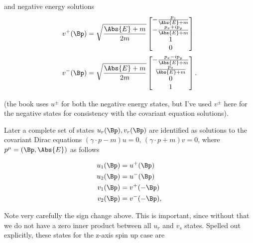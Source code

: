 and negative energy solutions
\begin{subequations}
\begin{align}\label{eqn:desaiDiracAdjoint:90}
v^{+}(\Bp) &=
\sqrt{\frac{\Abs{E} + m}{2m}}
\begin{bmatrix}
-\frac{p_z}{\Abs{E} + m} \\
-\frac{p_x + i p_y}{\Abs{E} + m} \\
1 \\
0 \\
\end{bmatrix} \\
v^{-}(\Bp) &=
\sqrt{\frac{\Abs{E} + m}{2m}}
\begin{bmatrix}
-\frac{p_x - i p_y}{\Abs{E} + m} \\
\frac{p_z}{\Abs{E} + m} \\
0 \\
1 \\
\end{bmatrix}.
\end{align}
\end{subequations}

(the book uses $u^{\pm}$ for both the negative energy states, but I've used $v^{\pm}$ here for the negative states for consistency with the covariant equation solutions). 

Later a complete set of states $u_r(\Bp), v_r(\Bp)$ are identified as solutions to the covariant Dirac equations $(\gamma \cdot p -m)u = 0$, $(\gamma \cdot p + m) v = 0$, where $p^\mu = (\Bp, \Abs{E})$ as follows

\begin{subequations}
\begin{align}\label{eqn:desaiDiracAdjoint:110}
u_1(\Bp) &= u^{+}(\Bp) \\
u_2(\Bp) &= u^{-}(\Bp) \\
v_1(\Bp) &= v^{+}(-\Bp) \\
v_2(\Bp) &= v^{-}(-\Bp),
\end{align}
\end{subequations}

Note very carefully the sign change above.  This is important, since without that we do not have a zero inner product between all $u_r$ and $v_s$ states.  Spelled out explicitly, these states for the z-axis spin up case are

